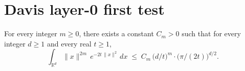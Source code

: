 %

\chapter{Davis layer-0 first test}
\label{chap:davis-l0}

\begin{lemma}
\label{lem:gaussian-radial}
For every integer $m \ge 0$, there exists a constant $C_m > 0$ such that
for every integer $d \ge 1$ and every real $t \ge 1$,
\[
  \int_{\mathbb{R}^d} \|x\|^{2m}\,e^{-2t\,\|x\|^2}\,dx
  \;\le\; C_m\,\bigl(d/t\bigr)^m \cdot \bigl(\pi/(2t)\bigr)^{d/2}.
\]
\end{lemma}

